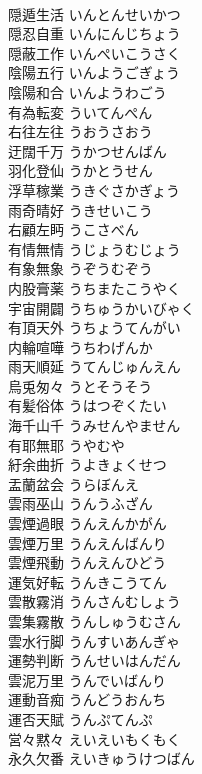 \documentclass[8pt]{extreport}
\begin{document}
\begin{CJK}{UTF8}{min}
\\	隠遁生活	いんとんせいかつ	
\\	隠忍自重	いんにんじちょう	
\\	隠蔽工作	いんぺいこうさく	
\\	陰陽五行	いんようごぎょう	
\\	陰陽和合	いんようわごう	
\\	有為転変	ういてんぺん	
\\	右往左往	うおうさおう	
\\	迂闊千万	うかつせんばん	
\\	羽化登仙	うかとうせん	
\\	浮草稼業	うきぐさかぎょう	
\\	雨奇晴好	うきせいこう	
\\	右顧左眄	うこさべん	
\\	有情無情	うじょうむじょう	
\\	有象無象	うぞうむぞう	
\\	内股膏薬	うちまたこうやく	
\\	宇宙開闢	うちゅうかいびゃく	
\\	有頂天外	うちょうてんがい	
\\	内輪喧嘩	うちわげんか	
\\	雨天順延	うてんじゅんえん	
\\	烏兎匆々	うとそうそう	
\\	有髪俗体	うはつぞくたい	
\\	海千山千	うみせんやません	
\\	有耶無耶	うやむや	
\\	紆余曲折	うよきょくせつ	
\\	盂蘭盆会	うらぼんえ	
\\	雲雨巫山	うんうふざん	
\\	雲煙過眼	うんえんかがん	
\\	雲煙万里	うんえんばんり	
\\	雲煙飛動	うんえんひどう	
\\	運気好転	うんきこうてん	
\\	雲散霧消	うんさんむしょう	
\\	雲集霧散	うんしゅうむさん	
\\	雲水行脚	うんすいあんぎゃ	
\\	運勢判断	うんせいはんだん	
\\	雲泥万里	うんでいばんり	
\\	運動音痴	うんどうおんち	
\\	運否天賦	うんぷてんぷ	
\\	営々黙々	えいえいもくもく	
\\	永久欠番	えいきゅうけつばん	

\end{CJK}
\end{document}
